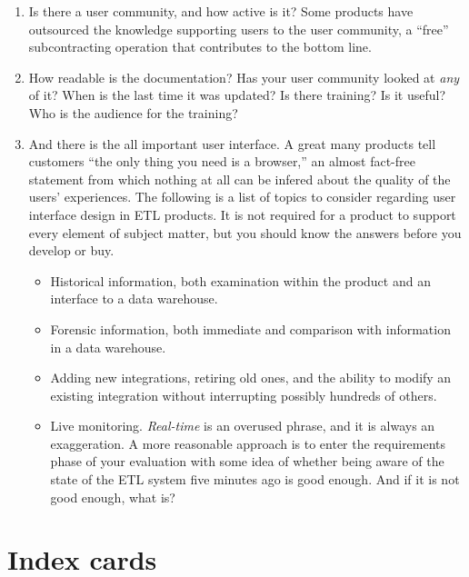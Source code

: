 \documentclass[11pt,letterpaper,twosided]{memoir}
\begin{document}
\begin{description}
\begin{enumerate}
\item Is there a user community, and how active is it? Some products
have outsourced the knowledge supporting users to the user 
community, a ``free'' subcontracting operation that contributes
to the bottom line.

\item How readable is the documentation? Has your user community
looked at \emph{any} of it? When is the last time it was updated?
Is there training? Is it useful? Who is the audience for the training?

\item And there is the all important user interface. A great many
products tell customers ``the only thing you need is a browser,''
an almost fact-free statement from which nothing at all can be
infered about the quality of the users' experiences.  The following
is a list of topics to consider regarding user interface design in
ETL products.  It is not required for a product to support every
element of subject matter, but you should know the answers before
you develop or buy.

\begin{itemize}
\item Historical information, both examination within the product
and an interface to a data warehouse.

\item Forensic information, both immediate and comparison with
information in a data warehouse.

\item Adding new integrations, retiring old ones, and the ability
to modify an existing integration without interrupting possibly
hundreds of others.

\item Live monitoring. \emph{Real-time} is an overused phrase, and
it is always an exaggeration. A more reasonable approach is to enter
the requirements phase of your evaluation with some idea of whether
being aware of the state of the ETL system five minutes ago is good
enough. And if it is not good enough, what is?

\end{itemize}

\end{enumerate}


\end{description}
\section{Index cards}
\end{document}
